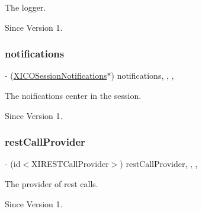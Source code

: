 The logger. 

\begin{DoxySince}{Since}
Version 1. 
\end{DoxySince}
\hypertarget{category_x_i_session_internal_07_08_acea05d51d24a4832ad5d4466d4ded648}{}\label{category_x_i_session_internal_07_08_acea05d51d24a4832ad5d4466d4ded648} 
\subsubsection{\texorpdfstring{notifications}{notifications}}
{\footnotesize\ttfamily -\/ (\hyperlink{interface_x_i_c_o_session_notifications}{X\+I\+C\+O\+Session\+Notifications}$\ast$) notifications\hspace{0.3cm}{\ttfamily [read]}, {\ttfamily [write]}, {\ttfamily [nonatomic]}, {\ttfamily [strong]}}



The noifications center in the session. 

\begin{DoxySince}{Since}
Version 1. 
\end{DoxySince}
\hypertarget{category_x_i_session_internal_07_08_a82a93ab90616ebd6c9ecf7afec360626}{}\label{category_x_i_session_internal_07_08_a82a93ab90616ebd6c9ecf7afec360626} 
\subsubsection{\texorpdfstring{rest\+Call\+Provider}{restCallProvider}}
{\footnotesize\ttfamily -\/ (id$<$X\+I\+R\+E\+S\+T\+Call\+Provider$>$) rest\+Call\+Provider\hspace{0.3cm}{\ttfamily [read]}, {\ttfamily [write]}, {\ttfamily [nonatomic]}, {\ttfamily [strong]}}



The provider of rest calls. 

\begin{DoxySince}{Since}
Version 1. 
\end{DoxySince}
\hypertarget{category_x_i_session_internal_07_08_a0bde5674ebda588ae03329b307ea476f}{}\label{category_x_i_session_internal_07_08_a0bde5674ebda588ae03329b307ea476f} 

